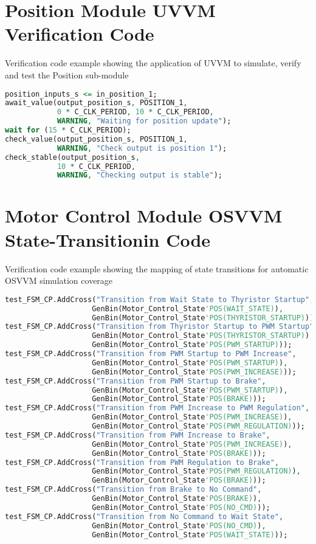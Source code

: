 \section{Position Module UVVM Verification Code}
\label{UVVM_Position_Code}
Verification code example showing the application of UVVM to simulate, verify and test the Position sub-module
\begin{lstlisting}[language=VHDL]
position_inputs_s <= in_position_1;
await_value(output_position_s, POSITION_1, 
            0 * C_CLK_PERIOD, 10 * C_CLK_PERIOD, 
            WARNING, "Waiting for position update");
wait for (15 * C_CLK_PERIOD);
check_value(output_position_s, POSITION_1, 
            WARNING, "Check output is position 1");
check_stable(output_position_s, 
            10 * C_CLK_PERIOD, 
            WARNING, "Checking output is stable");
\end{lstlisting}



\section{Motor Control Module OSVVM State-Transitionin Code}
\label{OSVVM_Motor_Bins}
Verification code example showing the mapping of state transitions for automatic OSVVM simulation coverage

\begin{lstlisting}[language=VHDL]
test_FSM_CP.AddCross("Transition from Wait State to Thyristor Startup",
                    GenBin(Motor_Control_State'POS(WAIT_STATE)),
                    GenBin(Motor_Control_State'POS(THYRISTOR_STARTUP)));
test_FSM_CP.AddCross("Transition from Thyristor Startup to PWM Startup",
                    GenBin(Motor_Control_State'POS(THYRISTOR_STARTUP)), 
                    GenBin(Motor_Control_State'POS(PWM_STARTUP)));
test_FSM_CP.AddCross("Transition from PWM Startup to PWM Increase",
                    GenBin(Motor_Control_State'POS(PWM_STARTUP)),
                    GenBin(Motor_Control_State'POS(PWM_INCREASE)));
test_FSM_CP.AddCross("Transition from PWM Startup to Brake",
                    GenBin(Motor_Control_State'POS(PWM_STARTUP)), 
                    GenBin(Motor_Control_State'POS(BRAKE)));
test_FSM_CP.AddCross("Transition from PWM Increase to PWM Regulation", 
                    GenBin(Motor_Control_State'POS(PWM_INCREASE)), 
                    GenBin(Motor_Control_State'POS(PWM_REGULATION)));
test_FSM_CP.AddCross("Transition from PWM Increase to Brake", 
                    GenBin(Motor_Control_State'POS(PWM_INCREASE)), 
                    GenBin(Motor_Control_State'POS(BRAKE)));
test_FSM_CP.AddCross("Transition from PWM Regulation to Brake", 
                    GenBin(Motor_Control_State'POS(PWM_REGULATION)), 
                    GenBin(Motor_Control_State'POS(BRAKE)));
test_FSM_CP.AddCross("Transition from Brake to No Command", 
                    GenBin(Motor_Control_State'POS(BRAKE)), 
                    GenBin(Motor_Control_State'POS(NO_CMD)));
test_FSM_CP.AddCross("Transition from No Command to Wait State", 
                    GenBin(Motor_Control_State'POS(NO_CMD)),    
                    GenBin(Motor_Control_State'POS(WAIT_STATE)));
\end{lstlisting}